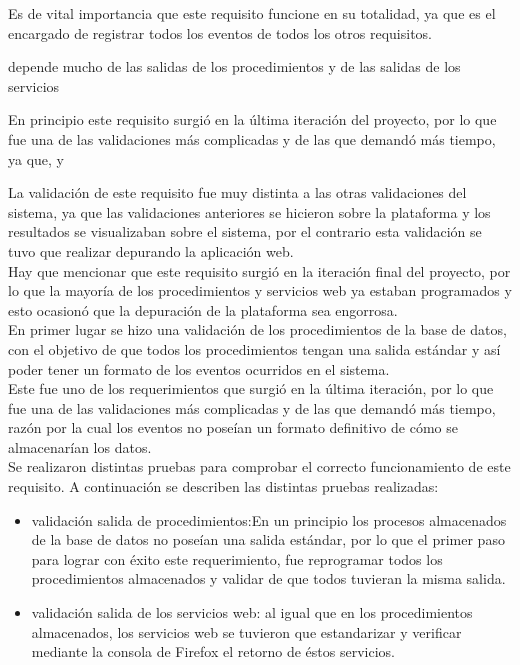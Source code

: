 Es de vital importancia que este requisito funcione en su totalidad, ya que es el encargado de registrar todos los eventos de todos los otros requisitos.


depende mucho de las salidas de los procedimientos y de las salidas de los servicios


En principio este requisito surgió en la última iteración del proyecto,  por lo que fue una de las validaciones más complicadas y de las que demandó más tiempo, ya que, y


La validación de este requisito fue muy distinta   a las otras validaciones del sistema, ya que las validaciones anteriores se hicieron sobre la plataforma y los resultados se visualizaban sobre el sistema, por el contrario esta validación se tuvo que realizar depurando la aplicación web.\\

Hay que mencionar que este requisito surgió en la iteración final del proyecto, por lo que la mayoría de los procedimientos y servicios web ya estaban programados y esto ocasionó que la depuración de la plataforma sea engorrosa.
\\

En primer lugar se hizo una validación de los procedimientos de la base de datos, con el objetivo de que todos los procedimientos tengan una salida estándar y así poder tener un formato de los eventos ocurridos en el sistema.
\\





Este fue uno de los requerimientos que surgió en la última iteración, por lo que fue una de las validaciones más complicadas y de las que demandó más tiempo, razón por la cual los eventos no poseían un formato definitivo de cómo se almacenarían los datos.
\\

Se realizaron distintas pruebas para comprobar el correcto funcionamiento de este requisito. A continuación se describen las distintas pruebas realizadas:

\begin{itemize}
	\item validación salida de procedimientos:En un principio los procesos almacenados de la base de datos no poseían una salida estándar, por lo que el primer paso para lograr con éxito este requerimiento, fue reprogramar todos los procedimientos almacenados y validar de que todos tuvieran la misma salida.
	
	\item validación salida de los servicios web: al igual que en los procedimientos almacenados, los servicios web se tuvieron que estandarizar y verificar mediante la consola de Firefox el retorno de éstos servicios.
\end{itemize}





